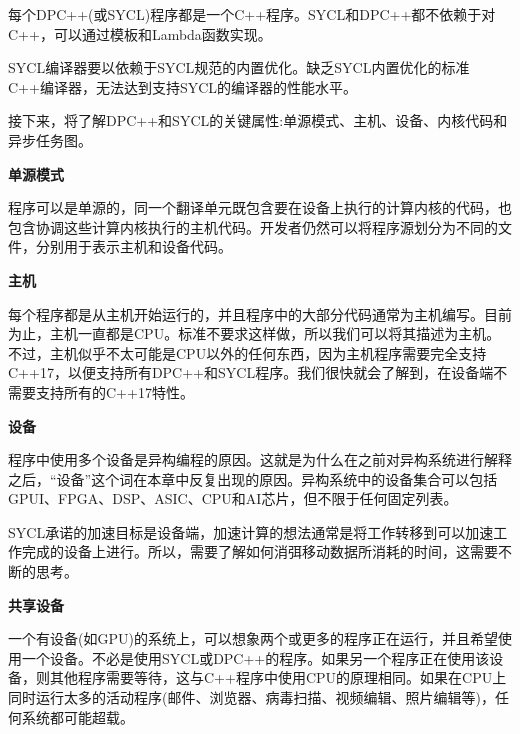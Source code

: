 每个DPC++(或SYCL)程序都是一个C++程序。SYCL和DPC++都不依赖于对C++，可以通过模板和Lambda函数实现。\par

SYCL编译器要以依赖于SYCL规范的内置优化。缺乏SYCL内置优化的标准C++编译器，无法达到支持SYCL的编译器的性能水平。\par

接下来，将了解DPC++和SYCL的关键属性:单源模式、主机、设备、内核代码和异步任务图。\par

\hspace*{\fill} \par %
\textbf{单源模式}

程序可以是单源的，同一个翻译单元既包含要在设备上执行的计算内核的代码，也包含协调这些计算内核执行的主机代码。开发者仍然可以将程序源划分为不同的文件，分别用于表示主机和设备代码。\par

\hspace*{\fill} \par %
\textbf{主机}

每个程序都是从主机开始运行的，并且程序中的大部分代码通常为主机编写。目前为止，主机一直都是CPU。标准不要求这样做，所以我们可以将其描述为主机。不过，主机似乎不太可能是CPU以外的任何东西，因为主机程序需要完全支持C++17，以便支持所有DPC++和SYCL程序。我们很快就会了解到，在设备端不需要支持所有的C++17特性。\par


\hspace*{\fill} \par %
\textbf{设备}

程序中使用多个设备是异构编程的原因。这就是为什么在之前对异构系统进行解释之后，“设备”这个词在本章中反复出现的原因。异构系统中的设备集合可以包括GPUI、FPGA、DSP、ASIC、CPU和AI芯片，但不限于任何固定列表。\par

SYCL承诺的加速目标是设备端，加速计算的想法通常是将工作转移到可以加速工作完成的设备上进行。所以，需要了解如何消弭移动数据所消耗的时间，这需要不断的思考。\par

\hspace*{\fill} \par %
\textbf{共享设备}

一个有设备(如GPU)的系统上，可以想象两个或更多的程序正在运行，并且希望使用一个设备。不必是使用SYCL或DPC++的程序。如果另一个程序正在使用该设备，则其他程序需要等待，这与C++程序中使用CPU的原理相同。如果在CPU上同时运行太多的活动程序(邮件、浏览器、病毒扫描、视频编辑、照片编辑等)，任何系统都可能超载。\par

